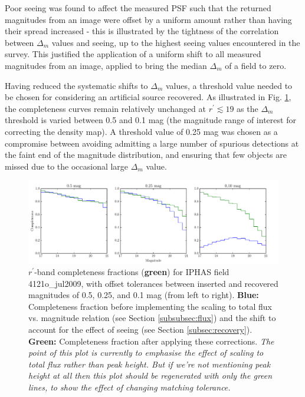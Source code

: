 \documentclass[a4paper,useAMS,usenatbib]{mn2e}
\begin{document}
Poor seeing was found to affect the measured PSF such that the returned
magnitudes from an image were offset by a uniform amount rather than having
their spread increased - this is illustrated by the tightness of the
correlation between $\Delta_m$ values and seeing, up to the highest seeing
values encountered in the survey. This justified the application of a uniform
shift to all measured magnitudes from an image, applied to bring the median
$\Delta_m$ of a field to zero.

Having reduced the systematic shifts to $\Delta_m$ values, a threshold value
needed to be chosen for considering an artificial source recovered. As
illustrated in Fig. \ref{fig:magnitude_match}, the completeness curves
remain relatively unchanged at $r^{\prime}\lesssim19$ as the $\Delta_m$ threshold is
varied between 0.5 and 0.1 mag (the magnitude range of interest for correcting
the density map). A threshold value of 0.25 mag was chosen as a compromise
between avoiding admitting a large number of spurious detections at the faint
end of the magnitude distribution, and ensuring that few objects are missed
due to the occasional large $\Delta_m$ value.


\begin{figure}
\begin{center}
\includegraphics[width=1\linewidth]{figures/magnitude_match.pdf} 
\caption{\footnotesize{$r^{\prime}$-band completeness fractions (\textbf{green}) for IPHAS field 4121o\_jul2009, with offset tolerances between inserted and recovered magnitudes of 0.5, 0.25, and 0.1 mag (from left to right). \textbf{Blue:} Completeness fraction before implementing the scaling to total flux vs. magnitude relation (see Section \ref{subsubsec:flux}) and the shift to account for the effect of seeing (see Section \ref{subsec:recovery}). \textbf{Green:} Completeness fraction after applying these corrections. \newline
\textit{The point of this plot is currently to emphasise the effect of scaling to total flux rather than peak height. But if we're not mentioning peak height at all then this plot should be regenerated with only the green lines, to show the effect of changing matching tolerance.}}}
\label{fig:magnitude_match}
\end{center}
\end{figure}
\end{document}
